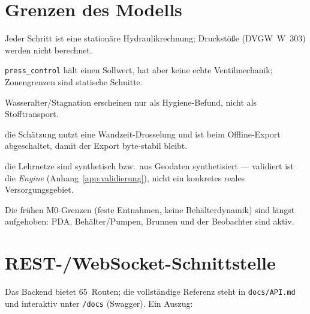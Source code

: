 \documentclass[11pt,a4paper,parskip=half]{scrreprt}
\newcommand{\api}[1]{\texttt{#1}}               %
\newcommand{\file}[1]{\texttt{#1}}              %
\begin{document}
\chapter{Grenzen des Modells}
\label{ch:grenzen}

\begin{description}[leftmargin=1.2em]
\item[Quasistatisch] Jeder Schritt ist eine stationäre Hydraulikrechnung;
  Druckstöße (DVGW~W~303) werden nicht berechnet.
\item[Druckminderer ohne Zustandsautomat] \texttt{press\_control} hält einen
  Sollwert, hat aber keine echte Ventilmechanik; Zonengrenzen sind statische
  Schnitte.
\item[Keine Wassergüte] Wasseralter/Stagnation erscheinen nur als Hygiene-Befund,
  nicht als Stofftransport.
\item[Beobachter nicht deterministisch] die Schätzung nutzt eine Wandzeit-Drosselung
  und ist beim Offline-Export abgeschaltet, damit der Export byte-stabil bleibt.
\item[Keine Feldvalidierung] die Lehrnetze sind synthetisch bzw.\ aus Geodaten
  synthetisiert — validiert ist die \emph{Engine} (Anhang~\ref{app:validierung}),
  nicht ein konkretes reales Versorgungsgebiet.
\end{description}

Die frühen M0-Grenzen (feste Entnahmen, keine Behälterdynamik) sind längst
aufgehoben: PDA, Behälter/Pumpen, Brunnen und der Beobachter sind aktiv.

\appendix
\chapter{REST-/WebSocket-Schnittstelle}
\label{app:api}

Das Backend bietet 65~Routen; die vollständige Referenz steht in
\file{docs/API.md} und interaktiv unter \api{/docs} (Swagger). Ein Auszug:
\end{document}
